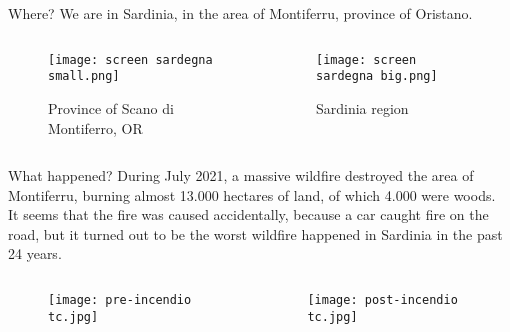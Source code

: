 \documentclass{beamer} %
\begin{document}
\begin{frame}{Where?}
We are in Sardinia, in the area of Montiferru, province of Oristano.
\bigskip
\begin{columns} %

    \begin{column}{0.5\textwidth} %
    \begin{figure}
        \centering
        \texttt{[image: screen sardegna small.png]}
        \caption{Province of Scano di Montiferro, OR}
    \end{figure}
    \end{column}
    
    \begin{column}{0.5\textwidth}
    \begin{figure}
        \centering
        \texttt{[image: screen sardegna big.png]}
        \caption{Sardinia region}
    \end{figure}
    \end{column}
    
\end{columns}
\end{frame}

\begin{frame}{What happened?}
During July 2021, a massive wildfire destroyed the area of Montiferru, burning almost 13.000 hectares of land, of which 4.000 were woods.\\It seems that the fire was caused accidentally, because a car caught fire on the road, but it turned out to be the worst wildfire happened in Sardinia in the past 24 years. 

\begin{columns}
    \begin{column}{0.5\textwidth}
        \begin{figure}
            \centering
            \texttt{[image: pre-incendio tc.jpg]}
        \end{figure}
    \end{column}

    \begin{column}{0.5\textwidth}
    \begin{figure}
        \centering
        \texttt{[image: post-incendio tc.jpg]}
    \end{figure}
    \end{column}
\end{columns}
\end{frame}
\end{document}
